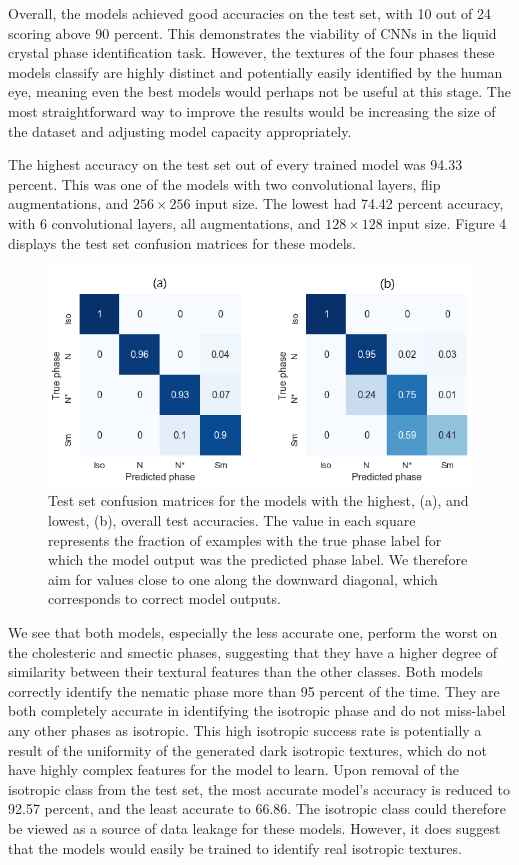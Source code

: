 \documentclass[12pt]{article}
\begin{document}
Overall, the models achieved good accuracies on the test set, with 10 out of 24 scoring above 90 percent. This demonstrates the viability of CNNs in the liquid crystal phase identification task. However, the textures of the four phases these models classify are highly distinct and potentially easily identified by the human eye, meaning even the best models would perhaps not be useful at this stage. The most straightforward way to improve the results would be increasing the size of the dataset and adjusting model capacity appropriately.

The highest accuracy on the test set out of every trained model was 94.33 percent. This was one of the models with two convolutional layers, flip augmentations, and $256 \times 256$ input size. The lowest had 74.42 percent accuracy, with 6 convolutional layers, all augmentations, and $128 \times 128$ input size. Figure 4 displays the test set confusion matrices for these models.
\begin{figure}[!htb]
	\centering
    \includegraphics[width=6in]{images/confusion_matrix.png}
    \caption{Test set confusion matrices for the models with the highest, (a), and lowest, (b), overall test accuracies. The value in each square represents the fraction of examples with the true phase label for which the model output was the predicted phase label. We therefore aim for values close to one along the downward diagonal, which corresponds to correct model outputs.}
\end{figure} 
We see that both models, especially the less accurate one, perform the worst on the cholesteric and smectic phases, suggesting that they have a higher degree of similarity between their textural features than the other classes. Both models correctly identify the nematic phase more than 95 percent of the time. They are both completely accurate in identifying the isotropic phase and do not miss-label any other phases as isotropic. This high isotropic  success rate is potentially a result of the uniformity of the generated dark isotropic textures, which do not have highly complex features for the model to learn. Upon removal of the isotropic class from the test set, the most accurate model's accuracy is reduced to 92.57 percent, and the least accurate to 66.86. The isotropic class could therefore be viewed as a source of data leakage for these models. However, it does suggest that the models would easily be trained to identify real isotropic textures. 
\end{document}
